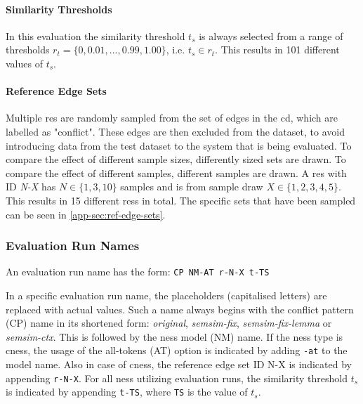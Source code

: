 \documentclass[11pt, numbers=noenddot]{scrreprt}
\begin{document}
\paragraph{Similarity Thresholds}
In this evaluation the similarity threshold \(t_s\) is always selected from a range of thresholds \(r_t = \{0, 0.01, ...,  0.99, 1.00\}\), i.e. \(t_s \in r_t\). This results in 101 different values of \(t_s\).


\paragraph{Reference Edge Sets}
Multiple \gls{res}  are randomly sampled from the set of edges in the \gls{cd}, which are labelled as "conflict". These edges are then excluded from the dataset, to avoid introducing data from the test dataset to the system that is being evaluated. To compare the effect of different sample sizes, differently sized sets are drawn. To compare the effect of different samples, different samples are drawn. A \gls{res} with ID \textit{N-X} has \(N \in \{1, 3, 10\}\) samples and is from sample draw \(X \in \{1, 2, 3, 4, 5\}\). This results in 15 different \gls{res}s in total. The specific sets that have been sampled can be seen in \cref{app-sec:ref-edge-sets}.


\subsubsection{Evaluation Run Names}
\label{sec:eval-run-names}
An evaluation run name has the form: \texttt{CP NM-AT r-N-X t-TS}

In a specific evaluation run name, the placeholders (capitalised letters) are replaced with actual values. Such a name always begins with the conflict pattern (CP) name in its shortened form: \textit{original}, \textit{semsim-fix}, \textit{semsim-fix-lemma} or \textit{semsim-ctx}. This is followed by the \gls{ness} model (NM) name. If the \gls{ness} type is \gls{cness}, the usage of the all-tokens (AT) option is indicated by adding \texttt{-at} to the model name. Also in case of \gls{cness}, the reference edge set ID N-X is indicated by appending \texttt{r-N-X}. For all \gls{ness} utilizing evaluation runs, the similarity threshold \(t_s\) is indicated by appending \texttt{t-TS}, where \texttt{TS} is the value of \(t_s\).
\end{document}
